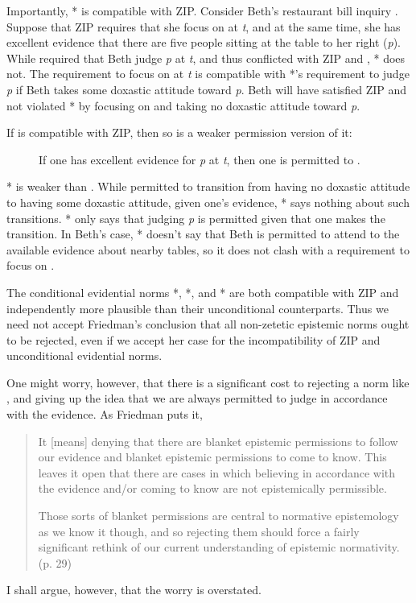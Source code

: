 \documentclass[12pt]{article}
\begin{document}
Importantly, \eo{}* is compatible with ZIP. Consider Beth's restaurant bill inquiry . Suppose that ZIP requires that she focus on  at \textit{t}, and at the same time, she has excellent evidence that there are five people sitting at the table to her right (\textit{p}). While \eo{} required that Beth judge \textit{p} at \textit{t}, and thus conflicted with ZIP and \js{}, \eo{}* does not. The requirement to focus on  at \textit{t} is compatible with \eo{}*'s requirement to judge \textit{p} if Beth takes some doxastic attitude toward \textit{p}. Beth will have satisfied ZIP and not violated \eo{}* by focusing on  and taking no doxastic attitude toward \textit{p}.

If \eo*{} is compatible with ZIP, then so is a weaker permission version of it:

\begin{description}
    \item[\ep*] If one has excellent evidence for \textit{p} at \textit{t}, then one is permitted to \judif{}.
\end{description}
%
\ep{}* is weaker than \ep{}. While \ep{} permitted to transition from having no doxastic attitude to having some doxastic attitude, given one's evidence, \ep{}* says nothing about such transitions. \ep{}* only says that judging \textit{p} is permitted given that one makes the transition. In Beth's case, \ep{}* doesn't say that Beth is permitted to attend to the available evidence about nearby tables, so it does not clash with a requirement to focus on .

The conditional evidential norms \eo{}*, \so{}*, and \ep{}* are both compatible with ZIP and independently more plausible than their unconditional counterparts. Thus we need not accept Friedman's conclusion that all non-zetetic epistemic norms ought to be rejected, even if we accept her case for the incompatibility of ZIP and unconditional evidential norms.

One might worry, however, that there is a significant cost to rejecting a norm like \ep{}, and giving up the idea that we are always permitted to judge in accordance with the evidence. As Friedman puts it,

\begin{quote}
It [means] denying that there are blanket epistemic permissions to follow our evidence and blanket epistemic permissions to come to know. This leaves it open that there are cases in which believing in accordance with the evidence and/or coming to know are not epistemically permissible.

Those sorts of blanket permissions are central to normative epistemology as we know it though, and so rejecting them should force a fairly significant rethink of our current understanding of epistemic normativity. (p. 29)
\end{quote}
%
I shall argue, however, that the worry is overstated.
\end{document}
